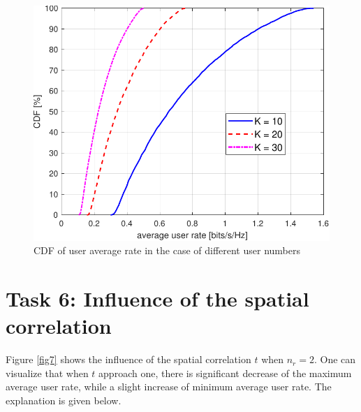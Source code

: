 \documentclass[10pt,conference]{IEEEtran}
\begin{document}
\begin{figure} [htb]
    \centering
    \includegraphics[width=1\linewidth]{Fig6.pdf} 
    \caption{CDF of user average rate in the case of different user numbers}
    \label{fig6}
\end{figure}

\section{Task 6: Influence of the spatial correlation}


Figure \ref{fig7} shows the influence of the spatial correlation $t$ when $n_r=2$.
One can visualize that when $t$ approach one, there is significant decrease of the 
maximum average user rate, while a slight increase of minimum average user rate.
The explanation is given below.
\end{document}
